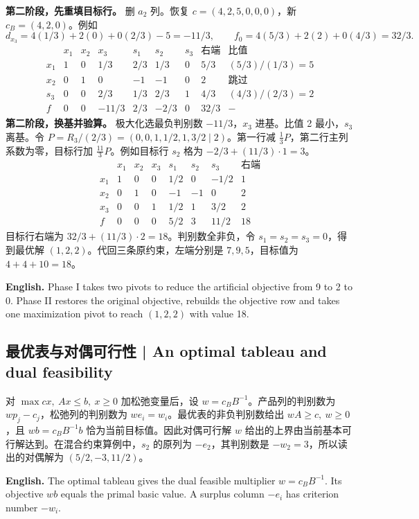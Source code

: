 \documentclass[UTF8,11pt,a4paper]{ctexart}
\newcommand{\EN}[1]{\par\noindent \textbf{English.} #1\par}
\begin{document}
\textbf{第二阶段，先重填目标行。} 删 $a_2$ 列。恢复 $c=(4,2,5,0,0,0)$，新 $c_B=(4,2,0)$。例如
\[
d_{x_3}=4(1/3)+2(0)+0(2/3)-5=-11/3,\qquad
f_0=4(5/3)+2(2)+0(4/3)=32/3 .
\]
\[
\begin{array}{c|rrrrrr|r|c}
&x_1&x_2&x_3&s_1&s_2&s_3&\text{右端}&\text{比值}\\\hline
x_1&1&0&1/3&2/3&1/3&0&5/3&(5/3)/(1/3)=5\\
x_2&0&1&0&-1&-1&0&2&\text{跳过}\\
s_3&0&0&\boxed{2/3}&1/3&2/3&1&4/3&(4/3)/(2/3)=2\\\hline
f&0&0&-11/3&2/3&-2/3&0&32/3&-
\end{array}
\]
\textbf{第二阶段，换基并验算。} 极大化选最负判别数 $-11/3$，$x_3$ 进基。比值 2 最小，$s_3$ 离基。令 $P=R_3/(2/3)=(0,0,1,1/2,1,3/2\mid2)$。第一行减 $\tfrac13 P$，第二行主列系数为零，目标行加 $\tfrac{11}3 P$。例如目标行 $s_2$ 格为 $-2/3+(11/3)\cdot1=3$。
\[
\begin{array}{c|rrrrrr|r}
&x_1&x_2&x_3&s_1&s_2&s_3&\text{右端}\\\hline
x_1&1&0&0&1/2&0&-1/2&1\\
x_2&0&1&0&-1&-1&0&2\\
x_3&0&0&1&1/2&1&3/2&2\\\hline
f&0&0&0&5/2&3&11/2&18
\end{array}
\]
目标行右端为 $32/3+(11/3)\cdot 2=18$。判别数全非负，令 $s_1=s_2=s_3=0$，得到最优解 $(1,2,2)$。代回三条原约束，左端分别是 $7,9,5$，目标值为 $4+4+10=18$。
\EN{Phase I takes two pivots to reduce the artificial objective from 9 to 2 to 0. Phase II restores the original objective, rebuilds the objective row and takes one maximization pivot to reach $(1,2,2)$ with value 18.}

\subsection{最优表与对偶可行性 | An optimal tableau and dual feasibility}
对 $\max cx,\ Ax\le b,\ x\ge0$ 加松弛变量后，设 $w=c_BB^{-1}$。产品列的判别数为 $wp_j-c_j$，松弛列的判别数为 $we_i=w_i$。最优表的非负判别数给出 $wA\ge c,\ w\ge0$，且 $wb=c_BB^{-1}b$ 恰为当前目标值。因此对偶可行解 $w$ 给出的上界由当前基本可行解达到。在混合约束算例中，$s_2$ 的原列为 $-e_2$，其判别数是 $-w_2=3$，所以读出的对偶解为 $(5/2,-3,11/2)$。
\EN{The optimal tableau gives the dual feasible multiplier $w=c_BB^{-1}$. Its objective $wb$ equals the primal basic value. A surplus column $-e_i$ has criterion number $-w_i$.}
\end{document}
